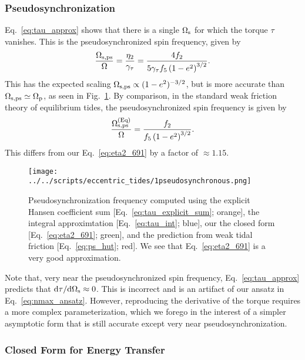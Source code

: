 \documentclass[
        fleqn,
        usenatbib,
    ]{mnras}
\newcommand*{\rdil}[2]{\mathrm{d}#1 / \mathrm{d}#2}
\newcommand*{\p}[1]{\left(#1\right)}
\begin{document}
\subsubsection{Pseudosynchronization}

Eq.~\eqref{eq:tau_approx} shows that there is a single $\Omega_{\rm s}$ for
which the torque $\tau$ vanishes. This is the pseudosynchronized spin
frequency, given by
\begin{equation}
    \frac{\Omega_{\rm s, ps}}{\Omega} =
        \frac{\eta_2}{\gamma_\tau} = \frac{4f_2}{5\gamma_\tau f_5\p{1 -
        e^2}^{3/2}}.\label{eq:eta2_691}
\end{equation}
This has the expected scaling $\Omega_{\rm s, ps} \propto (1 - e^2)^{-3/2}$,
but is more accurate than $\Omega_{\rm s, ps} \simeq \Omega_{\rm p}$, as seen
in Fig.~\ref{fig:pseudosync}. By comparison, in the standard weak friction
theory of equilibrium tides, the pseudosynchronized spin frequency is given by
\citep{alexander73, hut81}
\begin{equation}
    \frac{\Omega_{\rm s, ps}^{\rm (Eq)}}{\Omega} = \frac{f_2}{f_5\p{1 -
        e^2}^{3/2}}.\label{eq:ps_hut}
\end{equation}
This differs from our Eq.~\eqref{eq:eta2_691} by a factor of $\approx 1.15$.
\begin{figure}
    \centering
    \texttt{[image: ../../scripts/eccentric\_tides/1pseudosynchronous.png]}
    \caption{Pseudosynchronization frequency computed using the explicit Hansen
    coefficient sum [Eq.~\eqref{eq:tau_explicit_sum}; orange], the integral
    approximtation [Eq.~\eqref{eq:tau_int}; blue], our the closed form
    [Eq.~\eqref{eq:eta2_691}; green], and the prediction from weak tidal
    friction [Eq.~\eqref{eq:ps_hut}; red]. We see that Eq.~\eqref{eq:eta2_691}
    is a very good approximation.}\label{fig:pseudosync}
\end{figure}

Note that, very near the pseudosynchronized spin frequency,
Eq.~\eqref{eq:tau_approx} predicts that $\rdil{\tau}{\Omega_{\rm s}} \approx 0$.
This is incorrect and is an artifact of our ansatz in
Eq.~\eqref{eq:nmax_ansatz}. However, reproducing the derivative of the torque
requires a more complex parameterization, which we forego in the interest of a
simpler asymptotic form that is still accurate except very near
pseudosynchronization.

\subsubsection{Closed Form for Energy Transfer}
\end{document}
